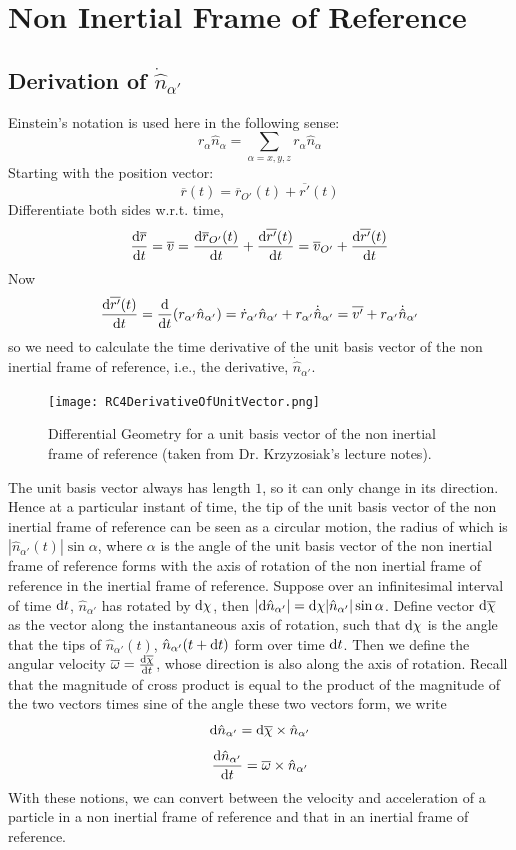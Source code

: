 \documentclass[a4paper,12pt,titlepage]{article}
\begin{document}
\section{Non Inertial Frame of Reference}
\subsection{Derivation of $\dot{\hat{n}}_{\alpha'}$}
Einstein's notation is used here in the following sense: 
\[r_{\alpha}\hat{n}_{\alpha}=\sum_{\alpha=x,y,z}r_{\alpha}\hat{n}_{\alpha}\]
Starting with the position vector:
\[\overline{r}(t)=\overline{r}_{O'}(t)+\overline{r'}(t)\]
Differentiate both sides w.r.t. time,
\[\frac{\mathrm{d} \overline{r}}{\mathrm{d} t}=\overline{v}=\frac{\mathrm{d} \overline{r}_{O'}(t)}{\mathrm{d} t}+\frac{\mathrm{d}\overline{r'}(t)}{\mathrm{d} t}=\overline{v}_{O'}+\frac{\mathrm{d} \overline{r'}(t)}{\mathrm{d} t}\]
Now \[\frac{\mathrm{d} \overline{r'}(t)}{\mathrm{d} t}=\frac{\mathrm{d}}{\mathrm{d} t}(r_{\alpha'}\hat n_{\alpha'})=\dot r_{\alpha'}\hat{n}_{\alpha'}+r_{\alpha'}\dot{\hat{n}}_{\alpha'}=\overline{v'}+r_{\alpha'}\dot{\hat{n}}_{\alpha'}\]
so we need to calculate the time derivative of the unit basis vector of the non inertial frame of reference, i.e., the derivative, $\dot{\hat{n}}_{\alpha'}$.
\begin{figure}[H]
\centering
\texttt{[image: RC4DerivativeOfUnitVector.png]}
\caption{Differential Geometry for a unit basis vector of the non inertial frame of reference (taken from Dr. Krzyzosiak's lecture notes).}
\end{figure}
The unit basis vector always has length $1$, so it can only change in its direction. Hence at a particular instant of time, the tip of the unit basis vector of the non inertial frame of reference can be seen as a circular motion, the radius of which is $|\hat{n}_{\alpha'}(t)|\sin\alpha$, where $\alpha$ is the angle of the unit basis vector of the non inertial frame of reference forms with the axis of rotation of the non inertial frame of reference in the inertial frame of reference. Suppose over an infinitesimal interval of time $\mathrm{d} t$, $\hat{n}_{\alpha'}$ has rotated by $\mathrm{d}\chi$, then
$|\mathrm{d}\hat{n}_{\alpha'}|=\mathrm{d}\chi|\hat{n}_{\alpha'}|\sin\alpha$. Define vector $\mathrm{d}\overline{\chi}$ as the vector along the instantaneous axis of rotation, such that $\mathrm{d}\chi$ is the angle that the tips of $\hat{n}_{\alpha'}(t)$, $\hat{n}_{\alpha'}(t+\mathrm{d} t)$ form over time $\mathrm{d} t$. Then we define the angular velocity $\overline{\omega}=\frac{\mathrm{d}\overline{\chi}}{\mathrm{d} t}$, whose direction is also along the axis of rotation. Recall that the magnitude of cross product is equal to the product of the magnitude of the two vectors times sine of the angle these two vectors form, we write
\[\mathrm{d}\hat{n}_{\alpha'}=\mathrm{d}\overline{\chi}\times\hat{n}_{\alpha'}\]\[\frac{\mathrm{d}\hat{n}_{\alpha'}}{\mathrm{d} t}=\overline{\omega}\times\hat n_{\alpha'}\]
With these notions, we can convert between the velocity and acceleration of a particle in a non inertial frame of reference and that in an inertial frame of reference.
\end{document}
